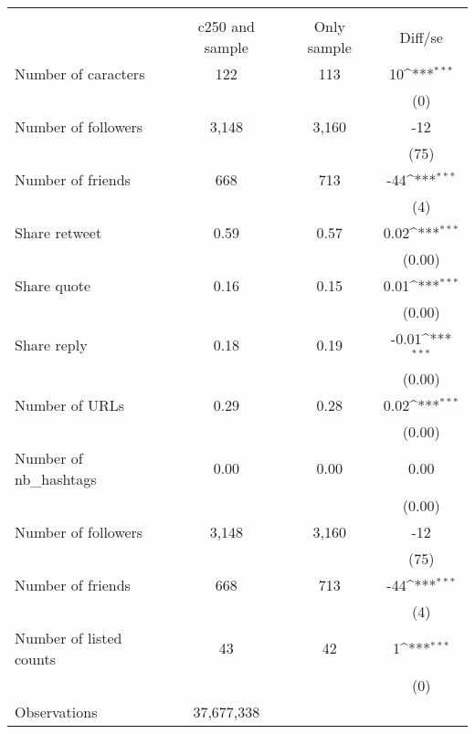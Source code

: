 {
\def\sym#1{\ifmmode^{#1}\else\(^{#1}\)\fi}
\begin{tabular}{l*{1}{ccc}}
\hline\hline
                    &\multicolumn{3}{c}{}                           \\
                    &c250 and sample& Only sample&     Diff/se         \\
\hline
Number of caracters &         122&         113&          10\sym{***}\\
                    &            &            &         (0)         \\
Number of followers &       3,148&       3,160&         -12         \\
                    &            &            &        (75)         \\
Number of friends   &         668&         713&         -44\sym{***}\\
                    &            &            &         (4)         \\
Share retweet       &        0.59&        0.57&        0.02\sym{***}\\
                    &            &            &      (0.00)         \\
Share quote         &        0.16&        0.15&        0.01\sym{***}\\
                    &            &            &      (0.00)         \\
Share reply         &        0.18&        0.19&       -0.01\sym{***}\\
                    &            &            &      (0.00)         \\
Number of URLs      &        0.29&        0.28&        0.02\sym{***}\\
                    &            &            &      (0.00)         \\
Number of nb\_hashtags&        0.00&        0.00&        0.00         \\
                    &            &            &      (0.00)         \\
Number of followers &       3,148&       3,160&         -12         \\
                    &            &            &        (75)         \\
Number of friends   &         668&         713&         -44\sym{***}\\
                    &            &            &         (4)         \\
Number of listed counts&          43&          42&           1\sym{***}\\
                    &            &            &         (0)         \\
\hline
Observations        &  37,677,338&            &                     \\
\hline\hline
\end{tabular}
}
